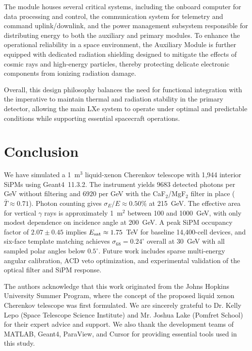 \documentclass{aastex701}
\begin{document}
The module houses several critical systems, including the onboard computer for data processing and control, the communication system for telemetry and command uplink/downlink, and the power management subsystem responsible for distributing energy to both the auxiliary and primary modules. To enhance the operational reliability in a space environment, the Auxiliary Module is further equipped with dedicated radiation shielding designed to mitigate the effects of cosmic rays and high-energy particles, thereby protecting delicate electronic components from ionizing radiation damage. 

Overall, this design philosophy balances the need for functional integration with the imperative to maintain thermal and radiation stability in the primary detector, allowing the main LXe system to operate under optimal and predictable conditions while supporting essential spacecraft operations.

\section{Conclusion}

We have simulated a 1~m$^3$ liquid-xenon Cherenkov telescope with 1{,}944 interior SiPMs using Geant4~11.3.2. The instrument yields $9683$ detected photons per GeV without filtering and $6920$ per GeV with the CaF$_2$/MgF$_2$ filter in place ($\bar{T}\approx 0.71$). Photon counting gives $\sigma_E/E \approx 0.50\%$ at 215~GeV. The effective area for vertical $\gamma$ rays is approximately 1~m$^2$ between 100 and 1000~GeV, with only modest dependence on incidence angle at 200~GeV. A peak SiPM occupancy factor of $2.07\pm 0.45$ implies $E_{\rm sat}\approx 1.75$~TeV for baseline 14{,}400-cell devices, and six-face template matching achieves $\sigma_{68}=0.24^\circ$ overall at 30~GeV with all sampled polar angles below $0.5^\circ$. Future work includes sparse multi-energy angular calibration, ACD veto optimization, and experimental validation of the optical filter and SiPM response.

\begin{acknowledgments}
The authors acknowledge that this work originated from the Johns Hopkins University Summer Program, where the concept of the proposed liquid xenon Cherenkov telescope was first formulated. We are sincerely grateful to Dr. Kelly Lepo (Space Telescope Science Institute) and Mr. Joshua Lake (Pomfret School) for their expert advice and support. We also thank the development teams of MATLAB, Geant4, ParaView, and Cursor for providing essential tools used in this study.
\end{acknowledgments}
\end{document}

